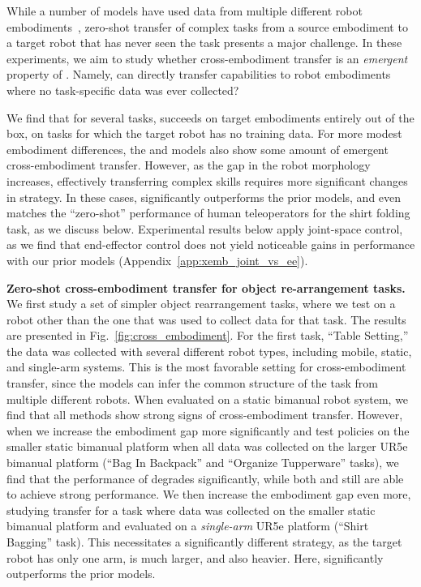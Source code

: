  \label{sec:cross_emb_transfer}

While a number of models have used data from multiple different robot embodiments~\citep{open_x_embodiment_rt_x_2023,yang2024pushing, team2024octo,wang2024hpt}, zero-shot transfer of complex tasks from a source embodiment to a target robot that has never seen the task presents a major challenge. In these experiments, we aim to study whether cross-embodiment transfer is an \emph{emergent} property of \MethodName{}. Namely, can \MethodName{} directly transfer capabilities to robot embodiments where no task-specific data was ever collected?

We find that for several tasks, \MethodName{} succeeds on target embodiments entirely out of the box, on tasks for which the target robot has no training data. For more modest embodiment differences, the \Pizf{} and \Pizs{} models also show some amount of emergent cross-embodiment transfer. However, as the gap in the robot morphology increases, effectively transferring complex skills requires more significant changes in strategy. In these cases, \MethodName{} significantly outperforms the prior models, and even matches the ``zero-shot'' performance of human teleoperators for the shirt folding task, as we discuss below. Experimental results below apply joint-space control, as we find that end-effector control does not yield noticeable gains in performance with our prior models (Appendix~\ref{app:xemb_joint_vs_ee}).


\noindent \textbf{Zero-shot cross-embodiment transfer for object re-arrangement tasks. }
We first study a set of simpler object rearrangement tasks, where we test \MethodName{} on a robot other than the one that was used to collect data for that task. The results are presented in Fig.~\ref{fig:cross_embodiment}. For the first task, ``Table Setting,'' the data was collected with several different robot types, including mobile, static, and single-arm systems. This is the most favorable setting for cross-embodiment transfer, since the models can infer the common structure of the task from multiple different robots. When evaluated on a static bimanual robot system, we find that all methods show strong signs of cross-embodiment transfer. However, when we increase the embodiment gap more significantly and test policies on the smaller static bimanual platform when all data was collected on the larger UR5e bimanual platform (``Bag In Backpack'' and ``Organize Tupperware'' tasks), we find that the performance of \Pizf{} degrades significantly, while both \Pizs{} and \MethodName{} still are able to achieve strong performance. We then increase the embodiment gap even more, studying transfer for a task where data was collected on the smaller static bimanual platform and evaluated on a \emph{single-arm} UR5e platform (``Shirt Bagging'' task). This necessitates a significantly different strategy, as the target robot has only one arm, is much larger, and also heavier. Here, \MethodName{} significantly outperforms the prior models.

